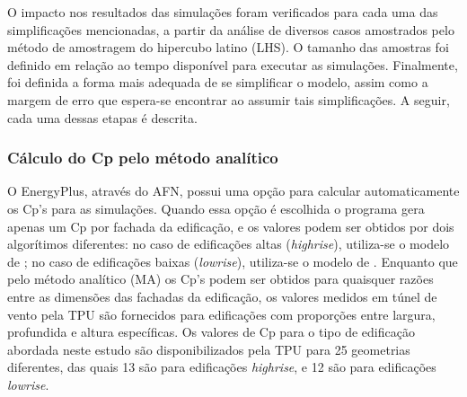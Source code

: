 \documentclass[brazil,hardcopy,openany,a5paper]{ufscthesis}
\begin{document}
		O impacto nos resultados das simulações foram verificados para cada uma das simplificações mencionadas, a partir da análise de diversos casos amostrados pelo método de amostragem do hipercubo latino (LHS). O tamanho das amostras foi definido em relação ao tempo disponível para executar as simulações.
		Finalmente, foi definida a forma mais adequada de se simplificar o modelo, assim como a margem de erro que espera-se encontrar ao assumir tais simplificações.
		A seguir, cada uma dessas etapas é descrita.
		
%		
%		
%		
		\subsubsection{Cálculo do Cp pelo método analítico}
		
		O EnergyPlus, através do AFN, possui uma opção para calcular automaticamente os Cp's para as simulações.
		Quando essa opção é escolhida o programa gera apenas um Cp por fachada da edificação, e os valores podem ser obtidos por dois algorítimos diferentes: no caso de edificações altas (\textit{highrise}), utiliza-se o modelo de  \cite{Atkins}; no caso de edificações baixas (\textit{lowrise}), utiliza-se o modelo de  \cite{SwamiChandra}.
		Enquanto que pelo método analítico (MA) os Cp's podem ser obtidos para quaisquer razões entre as dimensões das fachadas da edificação, os valores medidos em túnel de vento pela TPU são fornecidos para edificações com proporções entre largura, profundida e altura específicas.
		Os valores de Cp para o tipo de edificação abordada neste estudo são disponibilizados pela TPU para 25 geometrias diferentes, das quais 13 são para edificações \textit{highrise}, e 12 são para edificações \textit{lowrise}.
		
\end{document}
